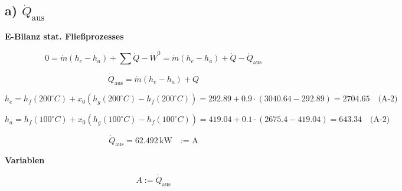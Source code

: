 \subsection*{a) $\dot{Q}_{\text{aus}}$}

\textbf{E-Bilanz stat. Fließprozesses}

\[
0 = \dot{m} \left( h_e - h_a \right) + \sum \dot{Q} - \dot{W}^0 = \dot{m} (h_e - h_a) + \dot{Q} - \dot{Q}_{\text{aus}}
\]

\[
\dot{Q}_{\text{aus}} = \dot{m} (h_e - h_a) + \dot{Q}
\]

\[
h_e = h_f(200^\circ C) + x_0 \left( h_g(200^\circ C) - h_f(200^\circ C) \right) = 292.89 + 0.9 \cdot (3040.64 - 292.89) = 2704.65 \quad \text{(A-2)}
\]

\[
h_a = h_f(100^\circ C) + x_0 \left( h_g(100^\circ C) - h_f(100^\circ C) \right) = 419.04 + 0.1 \cdot (2675.4 - 419.04) = 643.34 \quad \text{(A-2)}
\]

\[
\dot{Q}_{\text{aus}} = 62.492 \, \text{kW} \quad \text{:= A}
\]

\textbf{Variablen}

\[
A := \dot{Q}_{\text{aus}}
\]